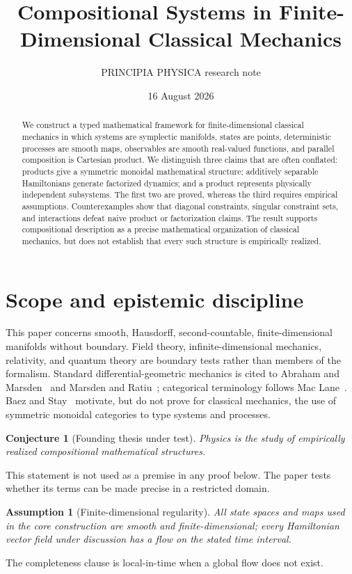 \documentclass[11pt]{article}
\title{Compositional Systems in Finite-Dimensional Classical Mechanics}
\author{PRINCIPIA PHYSICA research note}
\date{16 August 2026}
\newtheorem{assumption}[definition]{Assumption}
\newtheorem{conjecture}[definition]{Conjecture}
\begin{document}
\maketitle

\begin{abstract}
We construct a typed mathematical framework for finite-dimensional classical mechanics in which systems are symplectic manifolds, states are points, deterministic processes are smooth maps, observables are smooth real-valued functions, and parallel composition is Cartesian product.  We distinguish three claims that are often conflated: products give a symmetric monoidal mathematical structure; additively separable Hamiltonians generate factorized dynamics; and a product represents physically independent subsystems.  The first two are proved, whereas the third requires empirical assumptions.  Counterexamples show that diagonal constraints, singular constraint sets, and interactions defeat naive product or factorization claims.  The result supports compositional description as a precise mathematical organization of classical mechanics, but does not establish that every such structure is empirically realized.
\end{abstract}

\section{Scope and epistemic discipline}

This paper concerns smooth, Hausdorff, second-countable, finite-dimensional manifolds without boundary.  Field theory, infinite-dimensional mechanics, relativity, and quantum theory are boundary tests rather than members of the formalism.  Standard differential-geometric mechanics is cited to Abraham and Marsden~\cite{AbrahamMarsden1978} and Marsden and Ratiu~\cite{MarsdenRatiu1999}; categorical terminology follows Mac Lane~\cite{MacLane1998}.  Baez and Stay~\cite{BaezStay2011} motivate, but do not prove for classical mechanics, the use of symmetric monoidal categories to type systems and processes.

\begin{conjecture}[Founding thesis under test]
Physics is the study of empirically realized compositional mathematical structures.
\end{conjecture}
This statement is not used as a premise in any proof below.  The paper tests whether its terms can be made precise in a restricted domain.

\begin{assumption}[Finite-dimensional regularity]
All state spaces and maps used in the core construction are smooth and finite-dimensional; every Hamiltonian vector field under discussion has a flow on the stated time interval.
\end{assumption}
The completeness clause is local-in-time when a global flow does not exist.
\end{document}
